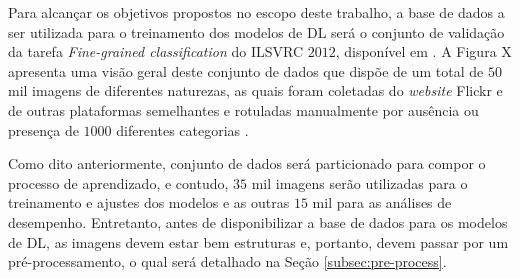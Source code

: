 Para alcançar os objetivos propostos no escopo deste trabalho, a base de dados a ser utilizada para o treinamento dos modelos de DL será o conjunto de validação da tarefa \emph{Fine-grained classification} do ILSVRC $2012$, disponível em \cite{ref:image-net}. A Figura X apresenta uma visão geral deste conjunto de dados que dispõe de um total de $50$ mil imagens de diferentes naturezas, as quais foram coletadas do \emph{website} Flickr e de outras plataformas semelhantes e rotuladas manualmente por ausência ou presença de $1000$ diferentes categorias \cite{ILSVRC}. 

Como dito anteriormente, conjunto de dados será particionado para compor o processo de aprendizado, e contudo, $35$ mil imagens serão utilizadas para o treinamento e ajustes dos modelos e as outras $15$ mil para as análises de desempenho. Entretanto, antes de disponibilizar a base de dados para os modelos de DL, as imagens devem estar bem estruturas e, portanto, devem passar por um pré-processamento, o qual será detalhado na Seção \ref{subsec:pre-process}.




